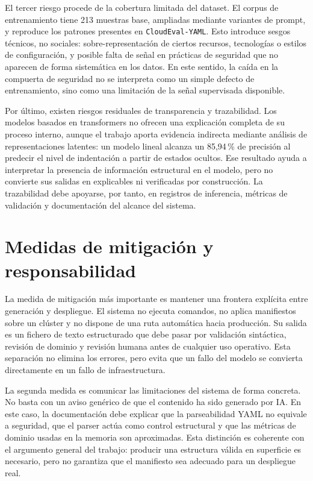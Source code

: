 El tercer riesgo procede de la cobertura limitada del dataset. El corpus de entrenamiento tiene
213 muestras base, ampliadas mediante variantes de prompt, y reproduce los patrones presentes
en \texttt{CloudEval-YAML}. Esto introduce sesgos técnicos, no sociales: sobre-representación de
ciertos recursos, tecnologías o estilos de configuración, y posible falta de señal en prácticas
de seguridad que no aparecen de forma sistemática en los datos. En este sentido, la caída en la
compuerta de seguridad no se interpreta como un simple defecto de entrenamiento, sino como una
limitación de la señal supervisada disponible.

Por último, existen riesgos residuales de transparencia y trazabilidad. Los modelos basados en
transformers no ofrecen una explicación completa de su proceso interno, aunque el trabajo aporta
evidencia indirecta mediante análisis de representaciones latentes: un modelo lineal alcanza un
85{,}94\,\% de precisión al predecir el nivel de indentación a partir de estados ocultos. Ese
resultado ayuda a interpretar la presencia de información estructural en el modelo, pero no
convierte sus salidas en explicables ni verificadas por construcción. La trazabilidad debe
apoyarse, por tanto, en registros de inferencia, métricas de validación y documentación del
alcance del sistema.


\section{Medidas de mitigación y responsabilidad}
\label{sec:ch8_mitigation}

La medida de mitigación más importante es mantener una frontera explícita entre generación y
despliegue. El sistema no ejecuta comandos, no aplica manifiestos sobre un clúster y no dispone
de una ruta automática hacia producción. Su salida es un fichero de texto estructurado que debe
pasar por validación sintáctica, revisión de dominio y revisión humana antes de cualquier uso
operativo. Esta separación no elimina los errores, pero evita que un fallo del modelo se
convierta directamente en un fallo de infraestructura.

La segunda medida es comunicar las limitaciones del sistema de forma concreta. No basta con un
aviso genérico de que el contenido ha sido generado por IA. En este caso, la documentación debe
explicar que la parseabilidad YAML no equivale a seguridad, que el parser actúa como control
estructural y que las métricas de dominio usadas en la memoria son
aproximadas. Esta distinción es coherente con el argumento general del trabajo: producir una
estructura válida en superficie es necesario, pero no garantiza que el manifiesto sea adecuado
para un despliegue real.

